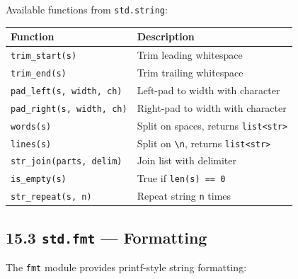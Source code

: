 \documentclass[
  english,
]{book}
\begin{document}
Available functions from \texttt{std.string}:

\begin{longtable}[]{@{}ll@{}}
\toprule\noalign{}
Function & Description \\
\midrule\noalign{}
\endhead
\bottomrule\noalign{}
\endlastfoot
\texttt{trim\_start(s)} & Trim leading whitespace \\
\texttt{trim\_end(s)} & Trim trailing whitespace \\
\texttt{pad\_left(s,\ width,\ ch)} & Left-pad to width with character \\
\texttt{pad\_right(s,\ width,\ ch)} & Right-pad to width with
character \\
\texttt{words(s)} & Split on spaces, returns
\texttt{list\textless{}str\textgreater{}} \\
\texttt{lines(s)} & Split on \texttt{\textbackslash{}n}, returns
\texttt{list\textless{}str\textgreater{}} \\
\texttt{str\_join(parts,\ delim)} & Join list with delimiter \\
\texttt{is\_empty(s)} & True if \texttt{len(s)\ ==\ 0} \\
\texttt{str\_repeat(s,\ n)} & Repeat string \texttt{n} times \\
\end{longtable}

\subsection{\texorpdfstring{15.3 \texttt{std.fmt} ---
Formatting}{15.3 std.fmt --- Formatting}}\label{std.fmt-formatting}

The \texttt{fmt} module provides printf-style string formatting:
\end{document}
